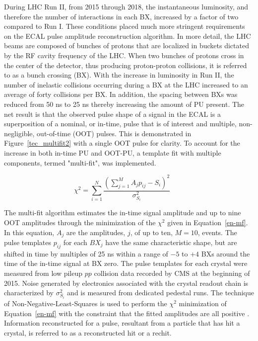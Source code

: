 During LHC Run II, from 2015 through 2018, the instantaneous luminosity, and therefore the number of interactions in each BX, increased by a factor of two compared to Run I. These conditions placed much more stringent requirements on the ECAL pulse amplitude reconstruction algorithm. In more detail, the LHC beams are composed of bunches of protons that are localized in buckets dictated by the RF cavity frequency of the LHC. When two bunches of protons cross in the center of the detector, thus producing proton-proton collisions, it is referred to as a bunch crossing (BX). With the increase in luminosity in Run II, the number of inelastic collisions occurring during a BX at the LHC increased to an average of forty collisions per BX. In addition, the spacing between BXs was reduced from 50 ns to 25 ns thereby increasing the amount of PU present. The net result is that the observed pulse shape of a signal in the ECAL is a superposition of a nominal, or in-time, pulse that is of interest and multiple, non-negligible, out-of-time (OOT) pulses. This is demonstrated in Figure~\ref{tec_multifit2} with a single OOT pulse for clarity. To account for the increase in both in-time PU and OOT-PU, a template fit with multiple components, termed "multi-fit", was implemented.  

\begin{equation}\label{en-mf}
    \chi^{2} = \sum^{N}_{i=1} \frac{(\sum^{M}_{j=1} A_{j}p_{ij} - S_{i} )^{2}}{\sigma^{2}_{S_{i}}}\qquad
\end{equation}

The multi-fit algorithm estimates the in-time signal amplitude and up to nine OOT amplitudes through the minimization of the $\chi^{2}$ given in Equation~\ref{en-mf}. In this equation, $A_{j}$ are the amplitudes, $j$, of up to ten, $M = 10$, events. The pulse templates $p_{ij}$ for each $BX_{j}$ have the same characteristic shape, but are shifted in time by multiples of 25 ns within a range of $-5$ to $+4$ BXs around the time of the in-time signal at BX zero.  The pulse templates for each crystal were measured from low pileup $pp$ collision data recorded by CMS at the beginning of 2015.  Noise generated by electronics associated with the crystal readout chain is characterized by $\sigma^{2}_{S_{i}}$ and is measured from dedicated pedestal runs.  The technique of Non-Negative-Least-Squares is used to perform the $\chi^{2}$ minimization of Equation~\ref{en-mf} with the constraint that the fitted amplitudes are all positive \cite{massironi2015precision}. Information reconstructed for a pulse, resultant from a particle that has hit a crystal, is referred to as a reconstructed hit or a rechit.

